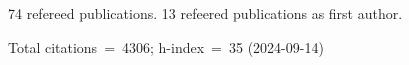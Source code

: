 74 refereed publications. 13 refeered publications as first author.

Total citations~=~4306; h-index~=~35 (2024-09-14)